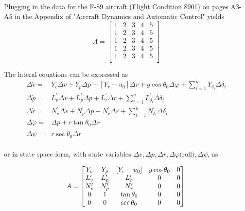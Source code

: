 \documentclass[12pt]{article}
\begin{document}
\noindent Plugging in the data for the F-89 aircraft (Flight Condition 8901) on pages A3-A5 in the Appendix of "Aircraft Dynamics and Automatic Control" yields
\begin{equation*}
A =
\begin{bmatrix}
    1 & 2 & 3 & 4 & 5 \\
    1 & 2 & 3 & 4 & 5 \\
    1 & 2 & 3 & 4 & 5 \\
    1 & 2 & 3 & 4 & 5 \\
    1 & 2 & 3 & 4 & 5 \\
\end{bmatrix}
\end{equation*}

\noindent The lateral equations can be expressed as
\begin{equation}
\begin{split}
\Delta \dot{v} = & Y_v\Delta v + Y_p\Delta p + \left[ Y_r - u_0 \right]\Delta r + g\cos\theta_0\Delta \varphi + \sum\limits_{i=1}^n Y_{\delta_i} \Delta \delta_i \\
\Delta \dot{p} = & L_v^\prime \Delta v + L_p^\prime \Delta p + L_r^\prime \Delta r + \sum\limits_{i=1}^n L_{\delta_i}^\prime \Delta \delta_i \\
\Delta \dot{r} = & N_v^\prime \Delta v + N_p^\prime \Delta p + N_r^\prime \Delta r + \sum\limits_{i=1}^n N_{\delta_i}^\prime \Delta \delta_i \\
\Delta \dot{\varphi} = &\Delta p + r\tan\theta_0\Delta r\\
\Delta \dot{\psi} = &r\sec\theta_0\Delta r\\
\end{split}
\label{lat}
\end{equation}

\noindent or in state space form, with state variables $\Delta v, \Delta p, \Delta r, \Delta \varphi \mbox{(roll)}, \Delta \psi $, as

\begin{equation*}
A =
\begin{bmatrix}
    Y_v & Y_p & \left[ Y_r-u_0 \right] & g\cos \theta_0 & 0 \\
    L_v^\prime & L_p^\prime & L_r^\prime & 0 & 0 \\
    N_v^\prime & N_p^\prime & N_r^\prime & 0 & 0 \\
    0 & 1 & \tan \theta_0 & 0 & 0 \\
    0 & 0 & \sec \theta_0 & 0 & 0
\end{bmatrix}\\
\end{equation*}
\end{document}
